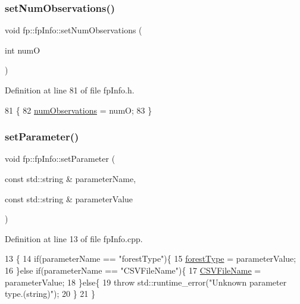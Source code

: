 \subsubsection{\texorpdfstring{set\+Num\+Observations()}{setNumObservations()}}
{\footnotesize\ttfamily void fp\+::fp\+Info\+::set\+Num\+Observations (\begin{DoxyParamCaption}\item[{int}]{numO }\end{DoxyParamCaption})\hspace{0.3cm}{\ttfamily [inline]}}



Definition at line 81 of file fp\+Info.\+h.


\begin{DoxyCode}
81                                                     \{
82                 \hyperlink{classfp_1_1fpInfo_a1b35cd17d4ddb35e232246a6549d7a74}{numObservations} = numO;
83             \}
\end{DoxyCode}
\mbox{\label{classfp_1_1fpInfo_ae4c749c466e983cb312cc08d38b2796e}} 
\subsubsection{\texorpdfstring{set\+Parameter()}{setParameter()}\hspace{0.1cm}{\footnotesize\ttfamily [1/3]}}
{\footnotesize\ttfamily void fp\+::fp\+Info\+::set\+Parameter (\begin{DoxyParamCaption}\item[{const std\+::string \&}]{parameter\+Name,  }\item[{const std\+::string \&}]{parameter\+Value }\end{DoxyParamCaption})}



Definition at line 13 of file fp\+Info.\+cpp.


\begin{DoxyCode}
13                                                                                             \{
14         \textcolor{keywordflow}{if}(parameterName == \textcolor{stringliteral}{"forestType"})\{
15             \hyperlink{classfp_1_1fpInfo_a3001fbf80d86022e53578d6adf133b90}{forestType} = parameterValue;
16         \}\textcolor{keywordflow}{else} \textcolor{keywordflow}{if}(parameterName == \textcolor{stringliteral}{"CSVFileName"})\{
17             \hyperlink{classfp_1_1fpInfo_aac01e5ddb27bc333e172a0422066af1c}{CSVFileName} = parameterValue;
18         \}\textcolor{keywordflow}{else}\{
19             \textcolor{keywordflow}{throw} std::runtime\_error(\textcolor{stringliteral}{"Unknown parameter type.(string)"});
20         \}
21     \}
\end{DoxyCode}
\mbox{\label{classfp_1_1fpInfo_a8ef4332ee98a1724ffd8614c4f80af91}} 
